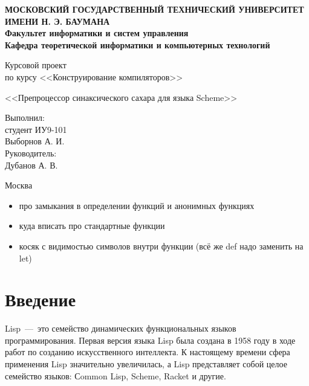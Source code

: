 \documentclass[12pt,a4paper,oneside]{extarticle}
\begin{document}
\pgfplotsset{compat=1.8}

\thispagestyle{empty}
\newpage
{
\centering


\textbf{
МОСКОВСКИЙ ГОСУДАРСТВЕННЫЙ ТЕХНИЧЕСКИЙ УНИВЕРСИТЕТ ИМЕНИ Н. Э. БАУМАНА \\
Факультет информатики и систем управления \\
Кафедра теоретической информатики и компьютерных технологий}
\bigskip
\bigskip
\bigskip
\bigskip
\bigskip
\bigskip
\bigskip

\vfill

Курсовой проект \\
по курсу <<Конструирование компиляторов>>

\bigskip

{\large <<Препроцессор синаксического сахара для языка Scheme>>}
\bigskip

\vfill



\hfill\parbox{4cm} {
Выполнил:\\
студент ИУ9-101 \hfill \\
Выборнов А. И.\hfill \medskip\\
Руководитель:\\
Дубанов А. В.\hfill
}


\vspace{\fill}

Москва \number\year
\clearpage
}


\tableofcontents

\clearpage

\begin{itemize}
    \item про замыкания в определении функций и анонимных функциях
    \item куда вписать про стандартные функции

\item косяк с видимостью символов внутри функции (всё же def надо заменить на let)

\end{itemize}

\clearpage

\section*{Введение}
    Lisp~---~это семейство динамических функциональных языков программирования.
    Первая версия языка Lisp была создана в 1958 году в ходе работ по созданию искусственного интеллекта.
    К настоящему времени сфера применения Lisp значительно увеличилась, а Lisp представляет собой целое семейство языков: Сommon Lisp, Scheme, Racket и другие. 
\end{document}
